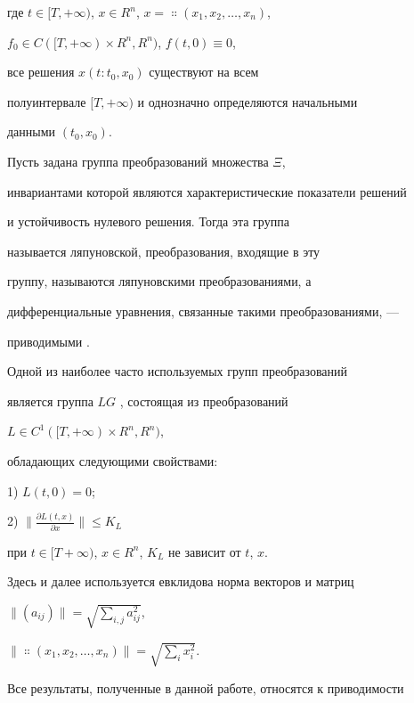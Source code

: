 где $t\in [T,+\infty)$, $x\in R^{n}$, $x=\Colon(x_{1},x_{2},\dotsc,x_{n})$,


$f_{0}\in C([T,+\infty)\times R^{n},R^{n})$, $f(t,0)\equiv 0$, 


все решения $x(t:t_{0},x_{0})$ существуют на всем


полуинтервале $[T,+\infty)$ и однозначно определяются начальными


данными $(t_{0},x_{0})$.


Пусть задана группа преобразований множества $\Xi$,


инвариантами которой являются характеристические показатели решений


и устойчивость нулевого решения. Тогда эта группа


называется ляпуновской, преобразования, входящие в эту


группу, называются ляпуновскими преобразованиями, а 


дифференциальные уравнения, связанные такими преобразованиями, ---


приводимыми \cite{VoskrOp}.





Одной из наиболее часто используемых групп преобразований


является группа $LG$ \cite{VoskrLa}, состоящая из преобразований


$L\in C^{1}([T,+\infty)\times R^{n},R^{n})$,


обладающих следующими свойствами:





1) $L(t,0)=0$;





2) $\big\|\frac{\partial L(t,x)}{\partial x}\big\|\leq K_{L}$


при $t\in[T+\infty)$, $x\in R^n$, $K_L$ не зависит от $t$, $x$.





Здесь и далее используется евклидова норма векторов и матриц


$\|(a_{ij})\|=\sqrt{\sum\limits_{i,j}a^2_{ij}}$,\linebreak


$\|\Colon(x_1,x_2,\dotsc,x_n)\|=\sqrt{\sum\limits_i x^2_i}$.





Все результаты, полученные в данной работе, относятся к приводимости


